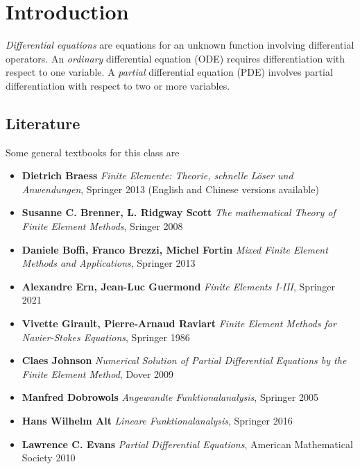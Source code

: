 \chapter{Introduction}
%
{\em Differential equations} are equations for an unknown function
involving differential operators. An {\em ordinary} differential
equation (ODE) requires differentiation with respect to one variable. A {\em
partial} differential equation (PDE) involves partial differentiation with
respect to two or more variables.

\section{Literature}

Some general textbooks for this class are

\begin{itemize}
\item {\bf Dietrich Braess} {\it Finite Elemente: Theorie, schnelle L\"oser und Anwendungen}, Springer 2013 (English and Chinese versions available)
\item {\bf Susanne C. Brenner, L. Ridgway Scott} {\it The mathematical Theory of Finite Element Methods}, Sringer 2008
\item {\bf Daniele Boffi, Franco Brezzi, Michel Fortin} {\it Mixed Finite Element Methods and Applications}, Springer 2013
\item {\bf Alexandre Ern, Jean-Luc Guermond} {\it Finite Elements I-III}, Springer 2021
\item {\bf Vivette Girault, Pierre-Arnaud Raviart} {\it Finite Element Methods for Navier-Stokes Equations}, Springer 1986
\item {\bf Claes Johnson} {\it Numerical Solution of Partial Differential Equations by the Finite Element Method}, Dover 2009
\item {\bf Manfred Dobrowols} {\it Angewandte Funktionalanalysis}, Springer 2005
\item {\bf Hans Wilhelm Alt} {\it Lineare Funktionalanalysis}, Springer 2016
\item {\bf Lawrence C. Evans} {\it Partial Differential Equations}, American Mathematical Society 2010
\end{itemize}



